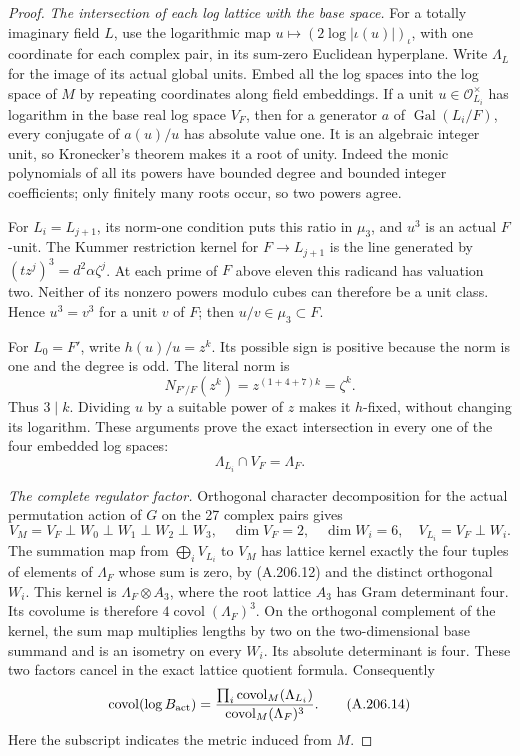 \begin{proof}
\emph{The intersection of each log lattice with the base space.}
For a totally imaginary field \(L\), use the logarithmic
map
\(u\mapsto(2\log|\iota(u)|)_\iota\), with one coordinate
for each complex pair, in its sum-zero Euclidean hyperplane.
Write \(\Lambda_L\) for the image of its actual global
units.  Embed all the log spaces into the log space of
\(M\) by repeating coordinates along field embeddings.
If a unit \(u\in\mathcal O_{L_i}^\times\) has logarithm
in the base real log space \(V_F\), then for a generator
\(a\) of \(\operatorname{Gal}(L_i/F)\), every conjugate
of \(a(u)/u\) has absolute value one.  It is an algebraic
integer unit, so Kronecker's theorem makes it a root of unity.
Indeed the monic polynomials of all its powers have bounded
degree and bounded integer coefficients; only finitely many
roots occur, so two powers agree.

For \(L_i=L_{j+1}\), its norm-one condition puts this
ratio in \(\mu_3\), and \(u^3\) is an actual \(F\)-unit.
The Kummer restriction kernel for \(F\to L_{j+1}\) is
the line generated by
\((tz^j)^3=d^2\alpha\zeta^j\).  At each prime of
\(F\) above eleven this radicand has valuation two.
Neither of its nonzero powers modulo cubes can therefore
be a unit class.  Hence \(u^3=v^3\) for a unit \(v\)
of \(F\); then \(u/v\in\mu_3\subset F\).

For \(L_0=F'\), write \(h(u)/u=z^k\).  Its possible
sign is positive because the norm is one and the degree
is odd.  The literal norm is
\[
        N_{F'/F}(z^k)=z^{(1+4+7)k}=\zeta^k.
\tag{A.206.11}
\]
Thus \(3\mid k\).  Dividing \(u\) by a suitable
power of \(z\) makes it \(h\)-fixed, without changing
its logarithm.  These arguments prove the exact intersection
in every one of the four embedded log spaces:
\[
                   \Lambda_{L_i}\cap V_F=\Lambda_F.
\tag{A.206.12}
\]

\emph{The complete regulator factor.}
Orthogonal character decomposition for the actual permutation
action of \(G\) on the 27 complex pairs gives
\[
 V_M=V_F\mathbin\perp W_0\mathbin\perp W_1
                   \mathbin\perp W_2\mathbin\perp W_3,
 \quad \dim V_F=2,\quad\dim W_i=6,
 \quad V_{L_i}=V_F\mathbin\perp W_i.
\tag{A.206.13}
\]
The summation map from \(\bigoplus_i V_{L_i}\) to
\(V_M\) has lattice kernel exactly the four tuples
of elements of \(\Lambda_F\) whose sum is zero, by
(A.206.12) and the distinct orthogonal \(W_i\).
This kernel is \(\Lambda_F\otimes A_3\), where the
root lattice \(A_3\) has Gram determinant four.
Its covolume is therefore
\(4\operatorname{covol}(\Lambda_F)^3\).
On the orthogonal complement of the kernel, the sum
map multiplies lengths by two on the two-dimensional
base summand and is an isometry on every \(W_i\).
Its absolute determinant is four.  These two factors
cancel in the exact lattice quotient formula.  Consequently
\[
 \operatorname{covol}(\log B_{\rm act})
   =\frac{\prod_i\operatorname{covol}_M(\Lambda_{L_i})}
          {\operatorname{covol}_M(\Lambda_F)^3}.
\tag{A.206.14}
\]
Here the subscript indicates the metric induced from \(M\).


\end{proof}
